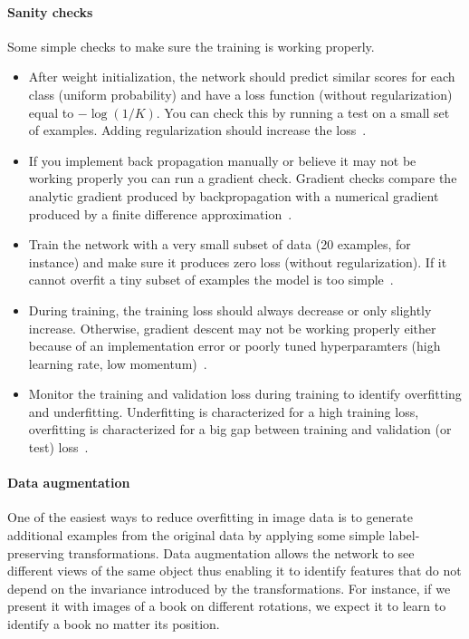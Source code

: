 \paragraph{Sanity checks}
Some simple checks to make sure the training is working properly.
\begin{itemize}
	\item After weight initialization, the network should predict similar scores for each class (uniform probability) and have a loss function (without regularization) equal to $-\log(1/K)$. You can check this by running a test on a small set of examples. Adding regularization should increase the loss~\cite{Karpathy2015}.

	\item If you implement back propagation manually or believe it may not be working properly you can run a gradient check. Gradient checks compare the analytic gradient produced by backpropagation with a numerical gradient produced by a finite difference approximation~\cite{Karpathy2015}.

	\item Train the network with a very small subset of data (20 examples, for instance) and make sure it produces zero loss (without regularization). If it cannot overfit a tiny subset of examples the model is too simple~\cite{Ng2014}.

	\item During training, the training loss should always decrease or only slightly increase. Otherwise, gradient descent may not be working properly either because of an implementation error or poorly tuned hyperparamters (high learning rate, low momentum)~\cite{Karpathy2015}.

	\item Monitor the training and validation loss during training to identify overfitting and underfitting. Underfitting is characterized for a high training loss, overfitting is characterized for a big gap between training and validation (or test) loss~\cite{Ng2014}.
\end{itemize}

\paragraph{Data augmentation}
One of the easiest ways to reduce overfitting in image data is to generate additional examples from the original data by applying some simple label-preserving transformations. Data augmentation allows the network to see different views of the same object thus enabling it to identify features that do not depend on the invariance introduced by the transformations. 
For instance, if we present it with images of a book on different rotations, we expect it to learn to identify a book no matter its position.

